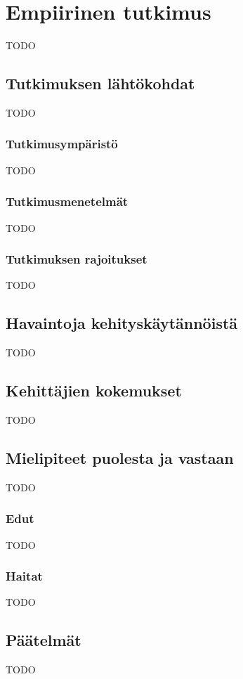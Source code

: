 \vspace{21.5pt}
\chapter{Empiirinen tutkimus}

TODO

\section{Tutkimuksen lähtökohdat}

TODO

\subsection{Tutkimusympäristö}

TODO

\subsection{Tutkimusmenetelmät}

TODO

\subsection{Tutkimuksen rajoitukset}


TODO
\section{Havaintoja kehityskäytännöistä}

TODO

\section{Kehittäjien kokemukset}

TODO

\section{Mielipiteet puolesta ja vastaan}
TODO
\subsection{Edut}

TODO

\subsection{Haitat}

TODO

\section{Päätelmät}

TODO